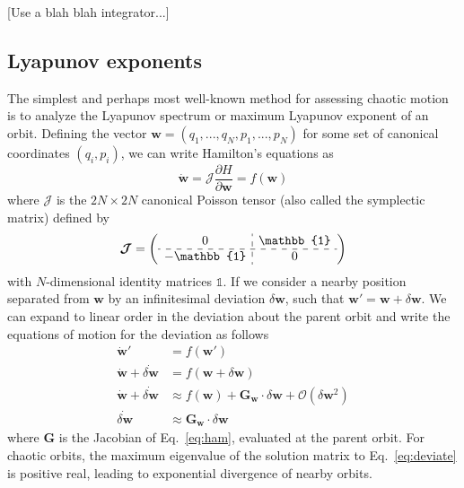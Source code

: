 \documentclass[letterpaper,12pt,preprint]{aastex}
\newcommand{\bs}[1]{\boldsymbol{#1}}
\newcommand{\ident}{\mathbb{1}}
\newcommand{\jac}{\bs{G}}
\begin{document}
[Use a blah blah integrator...]

\subsection{Lyapunov exponents}

The simplest and perhaps most well-known method for assessing chaotic motion is to analyze the Lyapunov spectrum or maximum Lyapunov exponent of an orbit. Defining the vector $\bs{w} = (q_1,...,q_N,p_1,...,p_N)$ for some set of canonical coordinates $(q_i,p_i)$, we can write Hamilton's equations as 
\begin{equation}
	\dot{\bs{w}} = \bs{\mathcal{J}} \frac{\partial H}{\partial \bs{w}} = f(\bs{w}) \label{eq:ham}
\end{equation}
where $\bs{\mathcal{J}}$ is the $2N \times 2N$ canonical Poisson tensor (also called the symplectic matrix) defined by
\begin{equation}
	\bs{\mathcal{J}} = \left( \begin{array}{c:c} 0 & \ident \\ \hdashline -\ident & 0 \end{array} \right)
\end{equation}
with $N$-dimensional identity matrices $\ident$. If we consider a nearby position separated from $\bs{w}$ by an infinitesimal deviation $\delta \bs{w}$, such that $\bs{w}' = \bs{w} + \delta \bs{w}$. We can expand to linear order in the deviation about the parent orbit and write the equations of motion for the deviation as follows
\begin{align}
	\dot{\bs{w}}' &= f(\bs{w}')\\
	\dot{\bs{w}} + \dot{\delta \bs{w}} &= f(\bs{w} +  \delta \bs{w})\\
	\dot{\bs{w}} + \dot{\delta \bs{w}} &\approx f(\bs{w}) + \jac_{\bs{w}}\cdot\delta \bs{w} + \mathcal{O}(\delta \bs{w}^2)\\
	\dot{\delta \bs{w}} &\approx \jac_{\bs{w}} \cdot  \delta \bs{w}\label{eq:deviate}
\end{align}
where $\jac$ is the Jacobian of Eq.~\ref{eq:ham}, evaluated at the parent orbit. For chaotic orbits, the maximum eigenvalue of the solution matrix to Eq.~\ref{eq:deviate} is positive real, leading to exponential divergence of nearby orbits. 
\end{document}
